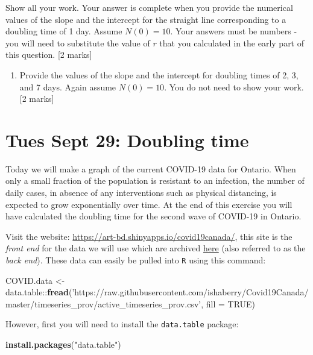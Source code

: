 \documentclass[]{book}
\newenvironment{Shaded}{\begin{snugshade}}{\end{snugshade}}
\newcommand{\KeywordTok}[1]{\textcolor[rgb]{0.13,0.29,0.53}{\textbf{{#1}}}}
\newcommand{\DataTypeTok}[1]{\textcolor[rgb]{0.13,0.29,0.53}{{#1}}}
\newcommand{\StringTok}[1]{\textcolor[rgb]{0.31,0.60,0.02}{{#1}}}
\newcommand{\OtherTok}[1]{\textcolor[rgb]{0.56,0.35,0.01}{{#1}}}
\newcommand{\NormalTok}[1]{{#1}}
\providecommand{\tightlist}{%
  \setlength{\itemsep}{0pt}\setlength{\parskip}{0pt}}
\begin{document}
Show all your work. Your answer is complete when you provide the
numerical values of the slope and the intercept for the straight line
corresponding to a doubling time of 1 day. Assume \(N(0)=10\). Your
answers must be numbers - you will need to substitute the value of \(r\)
that you calculated in the early part of this question. {[}2 marks{]}

\begin{enumerate}
\def\labelenumi{\arabic{enumi}.}
\setcounter{enumi}{8}
\tightlist
\item
  Provide the values of the slope and the intercept for doubling times
  of 2, 3, and 7 days. Again assume \(N(0)=10\). You do not need to show
  your work. {[}2 marks{]}
\end{enumerate}

\chapter{Tues Sept 29: Doubling time}\label{tues-sept-29-doubling-time}

Today we will make a graph of the current COVID-19 data for Ontario.
When only a small fraction of the population is resistant to an
infection, the number of daily cases, in absence of any interventions
such as physical distancing, is expected to grow exponentially over
time. At the end of this exercise you will have calculated the doubling
time for the second wave of COVID-19 in Ontario.

Visit the website: \url{https://art-bd.shinyapps.io/covid19canada/},
this site is the \emph{front end} for the data we will use which are
archived \href{https://github.com/ishaberry/Covid19Canada}{here} (also
referred to as the \emph{back end}). These data can easily be pulled
into \texttt{R} using this command:

\begin{Shaded}
\begin{Highlighting}[]
\NormalTok{COVID.data <-}\StringTok{ }\NormalTok{data.table::}\KeywordTok{fread}\NormalTok{(}\StringTok{'https://raw.githubusercontent.com/ishaberry/Covid19Canada/master/timeseries_prov/active_timeseries_prov.csv'}\NormalTok{, }\DataTypeTok{fill =} \OtherTok{TRUE}\NormalTok{)}
\end{Highlighting}
\end{Shaded}

However, first you will need to install the \texttt{data.table} package:

\begin{Shaded}
\begin{Highlighting}[]
\KeywordTok{install.packages}\NormalTok{(}\StringTok{"data.table"}\NormalTok{)}
\end{Highlighting}
\end{Shaded}
\end{document}
